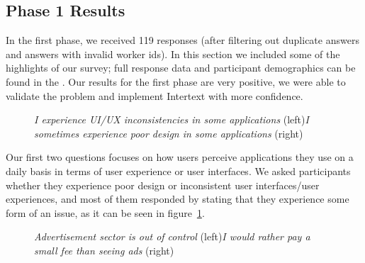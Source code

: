 \subsection{Phase 1 Results}

In the first phase, we received 119 responses (after filtering out duplicate answers and answers with invalid worker ids). In this section we included some of the highlights of our survey; full response data and participant demographics can be found in the . Our results for the first phase are very positive, we were able to validate the problem and implement Intertext with more confidence.


\begin{figure}[H]
\centering
{}
\vspace*{-5mm}
\caption{\newline\textit{I experience UI/UX inconsistencies in some applications} (left)\newline\textit{I sometimes experience poor design in some applications} (right)} \label{fig:ev_p1_1}
\end{figure}

Our first two questions focuses on how users perceive applications they use on a daily basis in terms of user experience or user interfaces. We asked participants whether they experience poor design or inconsistent user interfaces/user experiences, and most of them responded by stating that they experience some form of an issue, as it can be seen in figure~\ref{fig:ev_p1_1}.


\begin{figure}[H]
\centering
{}
\vspace*{-5mm}
\caption{\newline\textit{Advertisement sector is out of control} (left)\newline\textit{I would rather pay a small fee than seeing ads} (right)} \label{fig:ev_p1_2}
\end{figure}

